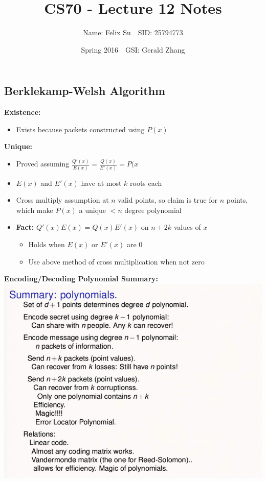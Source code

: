 \documentclass{article}\usepackage{amsmath,amssymb,amsthm,tikz,tkz-graph,color,chngpage,soul,hyperref,csquotes,graphicx,floatrow,circuitikz}\newcommand*{\QEDB}{\hfill\ensuremath{\square}}\newtheorem*{prop}{Proposition}\renewcommand{\theenumi}{\alph{enumi}}\usepackage[shortlabels]{enumitem}\usepackage[nobreak=true]{mdframed}\usetikzlibrary{matrix,calc}\MakeOuterQuote{"}\usepackage[margin=0.75in]{geometry} \newtheorem{theorem}{Theorem}
\title{CS70 - Lecture 12 Notes}
\author{Name: Felix Su$\quad$SID: 25794773}
\date{Spring 2016$\quad$GSI: Gerald Zhang}
\begin{document}
\maketitle

\subsection*{Berklekamp-Welsh Algorithm}
\textbf{Existence:}
\begin{itemize}
\item Exists because packets constructed using $P(x)$
\end{itemize}
\textbf{Unique:}
\begin{itemize}
\item Proved assuming $\frac{Q'(x)}{E(x)} = \frac{Q(x)}{E'(x)} = P(x$
\item $E(x)$ and $E'(x)$ have at most $k$ roots each
\item Cross multiply assumption at $n$ valid points, so claim is true for $n$ points, which make $P(x)$ a unique $< n$ degree polynomial
\item \textbf{Fact:} $Q'(x)E(x) = Q(x)E'(x)$ on $n+2k$ values of $x$
    \begin{itemize}
        \item Holds when $E(x)$ or $E'(x)$ are 0
        \item Use above method of cross multiplication when not zero
    \end{itemize}
\end{itemize}
\begin{mdframed}
\textbf{Encoding/Decoding Polynomial Summary:}\\
\includegraphics{polysum}
\end{mdframed}
\end{document}
